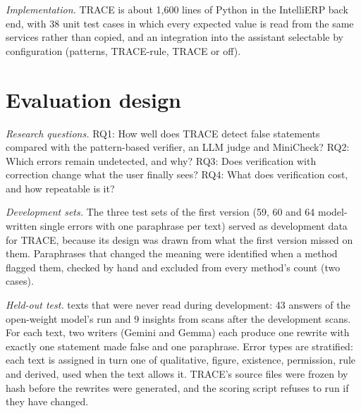 \documentclass[journal]{IEEEtran}
\renewcommand{\paragraph}[1]{\par\textit{#1}\enspace}
\begin{document}
\paragraph{Implementation.} TRACE is about 1,600 lines of Python in the IntelliERP back end, with 38 unit
test cases in which every expected value is read from the same services rather than copied, and an
integration into the assistant selectable by configuration (patterns, TRACE-rule, TRACE or off).

\section{Evaluation design}
\label{sec:evaluation}

\paragraph{Research questions.}
RQ1: How well does TRACE detect false statements compared with the pattern-based verifier, an LLM judge and
MiniCheck? RQ2: Which errors remain undetected, and why? RQ3: Does verification with correction change what
the user finally sees? RQ4: What does verification cost, and how repeatable is it?

\paragraph{Development sets.} The three test sets of the first version (59, 60 and 64 model-written single
errors with one paraphrase per text) served as development data for TRACE, because its design was drawn
from what the first version missed on them. Paraphrases that changed the meaning were identified when a
method flagged them, checked by hand and excluded from every method's count (two cases).

\paragraph{Held-out test.} 52 texts that were never read during development: 43 answers of the open-weight
model's run and 9 insights from scans after the development scans. For each text, two writers (Gemini and
Gemma) each produce one rewrite with exactly one statement made false and one paraphrase. Error types are
stratified: each text is assigned in turn one of qualitative, figure, existence, permission, rule and
derived, used when the text allows it. TRACE's source files were frozen by hash before the rewrites were
generated, and the scoring script refuses to run if they have changed.
\end{document}
